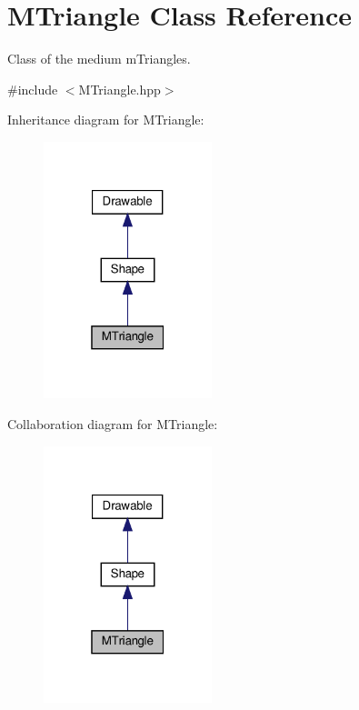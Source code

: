 \hypertarget{classMTriangle}{}\section{M\+Triangle Class Reference}
\label{classMTriangle}


Class of the medium mTriangles.




{\ttfamily \#include $<$M\+Triangle.\+hpp$>$}



Inheritance diagram for M\+Triangle\+:\nopagebreak
\begin{figure}[H]
\begin{center}
\leavevmode
\includegraphics[width=139pt]{classMTriangle__inherit__graph}
\end{center}
\end{figure}


Collaboration diagram for M\+Triangle\+:\nopagebreak
\begin{figure}[H]
\begin{center}
\leavevmode
\includegraphics[width=139pt]{classMTriangle__coll__graph}
\end{center}
\end{figure}
